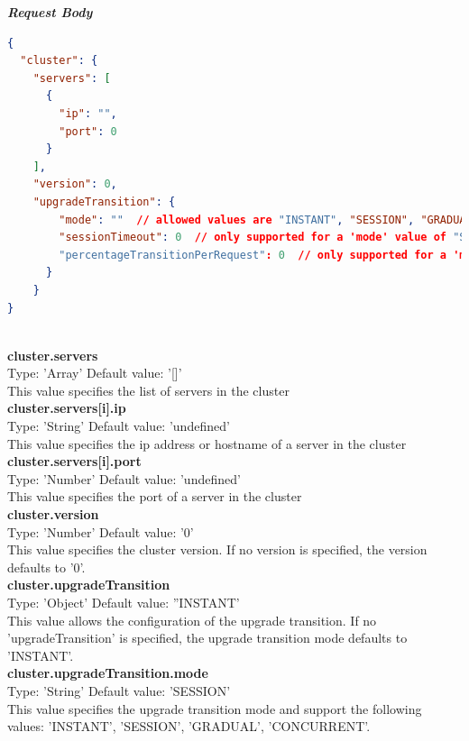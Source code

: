 \documentclass[a4paper,11pt,twoside]{article}
\begin{document}
\noindent
\textit{\textbf{Request Body}}
 
\begin{lstlisting}[language=json,firstnumber=1]
{
  "cluster": {
    "servers": [
      {
        "ip": "",
        "port": 0
      }
    ],
    "version": 0,
    "upgradeTransition": {
        "mode": ""  // allowed values are "INSTANT", "SESSION", "GRADUAL", "CONCURRENT"
        "sessionTimeout": 0  // only supported for a 'mode' value of "SESSION" 
        "percentageTransitionPerRequest": 0  // only supported for a 'mode' value of "GRADUAL"
      }
    }
}
\end{lstlisting}
\noindent \\
\textbf{cluster.servers}\\
\noindent
Type: 'Array'  Default value: '[]'\\
\noindent
This value specifies the list of servers in the cluster\\

\noindent
\textbf{cluster.servers[i].ip}\\
\noindent
Type: 'String' Default value: 'undefined'\\
\noindent
This value specifies the ip address or hostname of a server in the cluster\\

\noindent
\textbf{cluster.servers[i].port}\\
\noindent
Type: 'Number' Default value: 'undefined'\\
\noindent
This value specifies the port of a server in the cluster\\

\noindent
\textbf{cluster.version}\\
\noindent
Type: 'Number' Default value: '0'\\
\noindent
This value specifies the cluster version. If no version is specified, the version defaults to '0'. \\

\noindent
\textbf{cluster.upgradeTransition}\\
\noindent
Type: 'Object' Default value: ''INSTANT'\\
\noindent
This value allows the configuration of the upgrade transition. If no 'upgradeTransition' is specified, the upgrade transition mode defaults to 'INSTANT'.\\

\noindent
\textbf{cluster.upgradeTransition.mode}\\
\noindent
Type: 'String' Default value: 'SESSION'\\
\noindent
This value specifies the upgrade transition mode and support the following values: 'INSTANT', 'SESSION', 'GRADUAL', 'CONCURRENT'.\\
\end{document}
